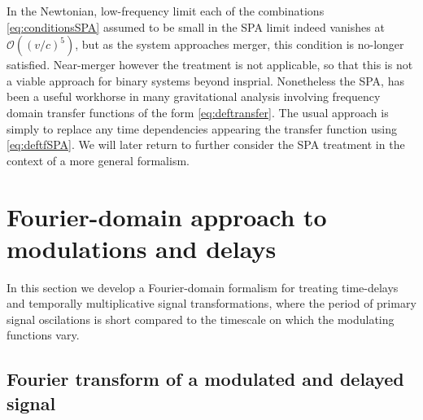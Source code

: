 \documentclass[aps,showpacs,twocolumn,
prd,superscriptaddress,nofootinbib]{revtex4-1}
\newcommand\calO{{\mathcal{O}}}
\newcommand{\jgb}[1]{{\color{DarkGreen} #1}}
\begin{document}
\jgb{In the Newtonian, low-frequency limit each of the combinations \eqref{eq:conditionsSPA} assumed to be small in the SPA limit indeed vanishes at $\calO{((v/c)^5)}$, but as the system approaches merger, this condition is no-longer satisfied.  Near-merger however the treatment is not applicable, so that this is not a viable approach for binary systems beyond insprial. Nonetheless the SPA, has been a useful workhorse in many gravitational analysis involving frequency domain transfer functions of the form \eqref{eq:deftransfer}.  The usual approach is simply to replace any time dependencies appearing the transfer function using \eqref{eq:deftfSPA}.  We will later return to further consider the SPA treatment in the context of a more general formalism.}



\section{Fourier-domain approach to modulations and delays}
\label{sec:formalism}


\jgb{In this section we develop a Fourier-domain formalism for treating time-delays and temporally multiplicative signal transformations, where the period of primary signal oscilations is short compared to the timescale on which the modulating functions vary.}

\subsection{Fourier transform of a modulated and delayed signal}
\label{subsec:FTgeneral}
\end{document}
